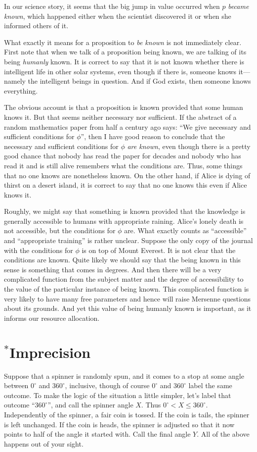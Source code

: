 In our science story, it seems that the big jump in value occurred when $p$ \textit{became known}, which happened 
either when the scientist discovered it or when she informed others of it. 

What exactly it means for a proposition to \textit{be known} is not immediately clear. 
First note that when we talk of a proposition being known, we are talking of its being \textit{humanly} known. 
It is correct to say that it is not known whether
there is intelligent life in other solar systems, even though if there is, someone knows it---namely the intelligent
beings in question. And if God exists, then someone knows everything.

The obvious account is that a proposition is known provided that some human knows it. But that seems neither necessary nor sufficient. If the abstract of a random mathematics paper from half a century ago says: ``We give necessary and sufficient conditions for $\phi$'', then I have good reason to conclude that the necessary and sufficient conditions for $\phi$ \textit{are known}, even
though there is a pretty good chance that nobody has read the paper for decades and nobody who has read it and
is still alive remembers what the conditions are. Thus, some things that no one knows are nonetheless known. 
On the other hand, if Alice is dying of thirst on a desert island, it is correct to say that no one knows this
even if Alice knows it.

Roughly, we might say that something is known provided that the knowledge is generally accessible to humans 
with appropriate raining. Alice's lonely death is not accessible, but the conditions for $\phi$ are. What exactly counts as ``accessible'' and ``appropriate training'' is rather unclear. Suppose the only copy of the journal with the 
conditions for $\phi$ is on top of Mount Everest. It is not clear that the conditions are known. Quite likely
we should say that the being known in this sense is something that comes in degrees. And then there will be a 
very complicated function from the subject matter and the degree of accessibility to the value of the particular
instance of being known. This complicated function is very likely to have many free parameters and hence will
raise Mersenne questions about its grounds. And yet this value of being humanly known is important, as it informs our resource allocation.


\section{$^*$Imprecision}
Suppose that a spinner is randomly spun, and it comes to a stop at some angle between $0^\circ$ and $360^\circ$, inclusive,
though of course $0^\circ$ and $360^\circ$ label the same outcome. To make the logic of the situation a little simpler, 
let's label that outcome ``$360^\circ$'', and call the spinner angle $X$. Thus $0^\circ < X \le 360^\circ$.
Independently of the spinner, a fair coin is tossed. If the coin is tails, the spinner is left
unchanged. If the coin is heads, the spinner is adjusted so that it now points to half of the angle it started with. Call the 
final angle $Y$. All of the above happens out of your sight.

